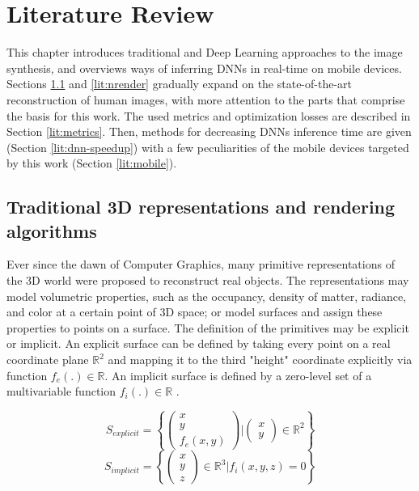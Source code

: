 \chapter{Literature Review}\label{chapter:lit}

This chapter introduces traditional and Deep Learning approaches to the image synthesis, and overviews ways of inferring DNNs in real-time on mobile devices. Sections \ref{lit:traditional-cg} and \ref{lit:nrender} gradually expand on the state-of-the-art reconstruction of human images, with more attention to the parts that comprise the basis for this work. The used metrics and optimization losses are described in Section \ref{lit:metrics}. Then, methods for decreasing DNNs inference time are given (Section \ref{lit:dnn-speedup}) with a few peculiarities of the mobile devices targeted by this work (Section \ref{lit:mobile}).

\section{Traditional 3D representations and rendering algorithms}
\label{lit:traditional-cg}

Ever since the dawn of Computer Graphics, many primitive representations of the 3D world were proposed to reconstruct real objects. The representations may model volumetric properties, such as the occupancy, density of matter, radiance, and color at a certain point of 3D space; or model surfaces and assign these properties to points on a surface. The definition of the primitives may be explicit or implicit. An explicit surface can be defined by taking every point on a real coordinate plane $\mathbb{R}^2$ and mapping it to the third "height" coordinate explicitly via function $f_e(.) \in \mathbb{R}$. An implicit surface is defined by a zero-level set of a multivariable function $f_i(.) \in \mathbb{R}$ \cite{survey:advances-nn22}.
\begin{multicols}{2}
\setlength\abovedisplayskip{0pt}
\noindent
\begin{equation}
	\renewcommand\arraystretch{0.6}
	S_{explicit} = \left\{ 
	\left( \begin{array}{c} x \\ y \\ f_{e}(x,y) \end{array} \right) \Bigg\rvert 
	\left( \begin{array}{c} x \\ y \end{array} \right) \in \mathbb{R}^2
	\right\}
\end{equation}
\begin{equation}
	\renewcommand\arraystretch{0.6}
	S_{implicit} = \left\{ \begin{pmatrix} x \\ y \\ z \end{pmatrix} \in \mathbb{R}^3 \Bigg\rvert f_{i}(x, y, z) = 0 \right\}
\end{equation}
\setlength\belowdisplayskip{0pt} 
\end{multicols} 

